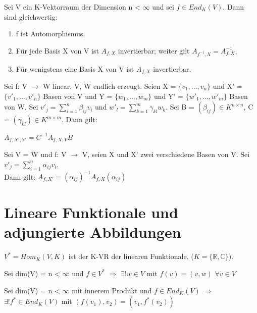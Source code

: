 \begin{lemma}
Sei V ein K-Vektorraum der Dimension n < $\infty$ und sei $f \in End_K (V)$. Dann sind gleichwertig:
\begin{enumerate}
\item f ist Automorphismus,
\item Für jede Basis X von V ist $A_{f,X}$ invertierbar; weiter gilt $A_{f^{-1},X} = A^{-1}_{f,X}$,
\item Für wenigstens eine Basis X von V ist $A_{f,X}$ invertierbar.
\end{enumerate}
\end{lemma}

\begin{theorem}
Sei f: V $\to$ W linear, V, W endlich erzeugt. Seien X = $\{v_1, …, v_n\}$ und X' = $\{v'_1, …, v'_n\}$ Basen von V und Y = $\{w_1, …, w_m\}$ und Y' = $\{w'_1, …, w'_m\}$ Basen von W. Sei $v'_j = \sum\nolimits_{i=1}^{n} \beta_{ij} v_i$ und $w'_l = \sum\nolimits_{k=1}^{m} \gamma_{kl} w_k$. Sei B = $(\beta_{ij}) \in K^{n \times n}$, C = $(\gamma_{kl}) \in K^{m \times m}$. Dann gilt:
\begin{compactenum}
\item $A_{f, X', Y'} = C^{-1} A_{f, X, Y} B$
\item Sei V = W und f: V $\to$ V, seien X und X' zwei verschiedene Basen von V. Sei $v'_j = \sum\nolimits_{i=1}^{n} \alpha_{ij} v_i$.\\
Dann gilt: $A_{f, X'} = (\alpha_{ij})^{-1} A_{f, X} (\alpha_{ij})$
\end{compactenum}
\end{theorem}


\section{Lineare Funktionale und adjungierte Abbildungen}
\begin{definition}
$V^* = Hom_K(V,K)$ ist der K-VR der linearen Funktionale. ($K = \{\mathbb{R}, \mathbb{C}\}$).
\end{definition}

\begin{lemma}
Sei dim(V) = n < $\infty$ und $f \in V^*$ $\Rightarrow$ $\exists ! w \in V$ mit $f(v) = (v,w)$ $\forall v \in V$
\end{lemma}

\begin{theorem}
Sei dim(V) = n < $\infty$ mit innerem Produkt und $ f \in End_K(V)$ $\Rightarrow$ $\exists ! f^* \in End_K(V)$ mit $(f(v_1), v_2) = (v_1, f^*(v_2))$
\end{theorem}

